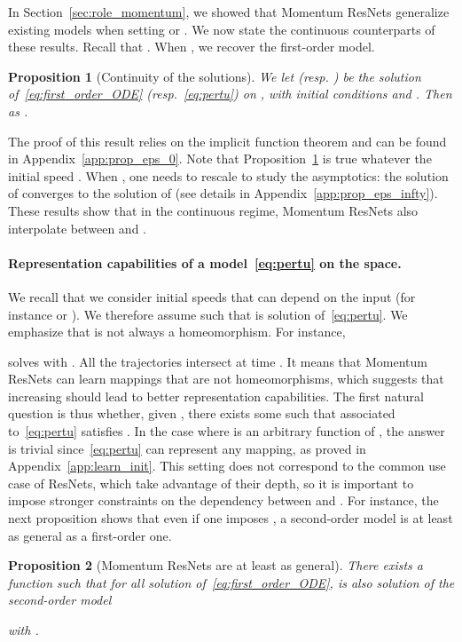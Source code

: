 \documentclass{article}
\newtheorem{proposition}{Proposition}
\begin{document}
In Section~\ref{sec:role_momentum}, we showed that Momentum ResNets generalize existing models when setting  or . We now state the continuous counterparts of these results.
Recall that . When , we recover the first-order model.
\begin{proposition}[Continuity of the solutions]\label{prop:eps_0}We let  (resp. ) be the solution of~\eqref{eq:first_order_ODE} (resp.~\eqref{eq:pertu}) on , with initial conditions  and .
Then   as .
\end{proposition} 
The proof of this result relies on the implicit function theorem and can be found in Appendix~\ref{app:prop_eps_0}.
Note that Proposition~\ref{prop:eps_0} is true whatever the initial speed . 
When , one needs to rescale  to study the asymptotics: the solution of  converges to the solution of  (see details in Appendix~\ref{app:prop_eps_infty}).
 These results show that in the continuous regime, Momentum ResNets also interpolate between  and .

\paragraph{Representation capabilities of a model~\eqref{eq:pertu} on the  space.}
We recall that we consider initial speeds  that can depend on the input  (for instance  or ). We therefore assume  such that  is solution of~\eqref{eq:pertu}. We emphasize that  is not always a homeomorphism. For instance, 

solves
 with . All the trajectories intersect at time . It means that Momentum ResNets can learn mappings that are not homeomorphisms, which suggests that increasing  should lead to better representation capabilities. The first natural question is thus whether, given , there exists some  such that  associated to~\eqref{eq:pertu} satisfies .
In the case where  is an arbitrary function of , the answer is trivial since~\eqref{eq:pertu} can represent any mapping, as proved in Appendix~\ref{app:learn_init}.
This setting does not correspond to the common use case of ResNets, which take advantage of their depth, so it is important to impose stronger constraints on the dependency between  and .  
For instance, the next proposition shows that even if one imposes , a second-order model is at least as general as a first-order one.

\begin{proposition}[Momentum ResNets are at least as general]\label{prop:bigger_set}
There exists a function  such that for all  solution of~\eqref{eq:first_order_ODE},  is also solution of the second-order model

with 
.
\end{proposition}
\end{document}
